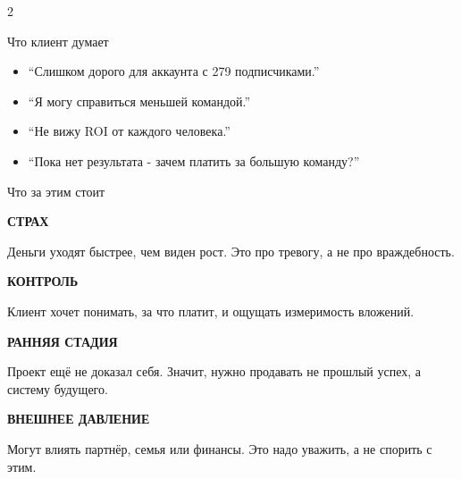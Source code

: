 \documentclass[11pt,a4paper]{article}
\newcommand{\minititle}[1]{{\sansfont\bfseries\fontsize{9.5}{11}\selectfont\color{rose}\MakeUppercase{#1}}}
\begin{document}
\begin{multicols}{2}
\begin{glassbox}
{\headingfont\fontsize{18}{20}\selectfont Что клиент думает}\par
\vspace{2mm}
\begin{softbox}[colback=accentsoft]
\begin{itemize}[leftmargin=5mm,itemsep=2.5mm,topsep=1mm]
  \item ``Слишком дорого для аккаунта с 279 подписчиками.''
  \item ``Я могу справиться меньшей командой.''
  \item ``Не вижу ROI от каждого человека.''
  \item ``Пока нет результата - зачем платить за большую команду?''
\end{itemize}
\end{softbox}
\end{glassbox}

\columnbreak

\begin{glassbox}
{\headingfont\fontsize{18}{20}\selectfont Что за этим стоит}\par
\vspace{2mm}
\begin{softbox}[colback=emeraldsoft]
\minititle{Страх}\par
Деньги уходят быстрее, чем виден рост. Это про тревогу, а не про враждебность.
\end{softbox}
\vspace{2.5mm}
\begin{softbox}[colback=emeraldsoft]
\minititle{Контроль}\par
Клиент хочет понимать, за что платит, и ощущать измеримость вложений.
\end{softbox}
\vspace{2.5mm}
\begin{softbox}[colback=emeraldsoft]
\minititle{Ранняя стадия}\par
Проект ещё не доказал себя. Значит, нужно продавать не прошлый успех, а систему будущего.
\end{softbox}
\vspace{2.5mm}
\begin{softbox}[colback=emeraldsoft]
\minititle{Внешнее давление}\par
Могут влиять партнёр, семья или финансы. Это надо уважить, а не спорить с этим.
\end{softbox}
\end{glassbox}
\end{multicols}
\end{document}

